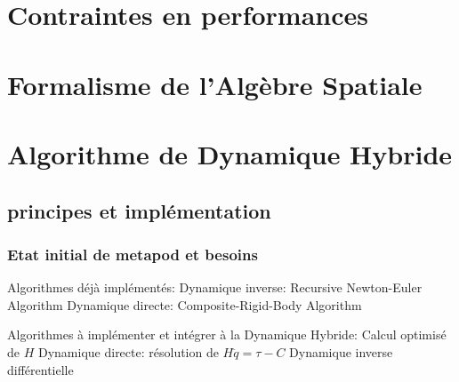 \documentclass[11pt]{beamer}
\begin{document}

\section{Contraintes en performances}


\section{Formalisme de l'Algèbre Spatiale}


\section{Algorithme de Dynamique Hybride}

\subsection{principes et implémentation}

\begin{frame}
  \frametitle{Etat initial de metapod et besoins}
 
  Algorithmes déjà implémentés:
  Dynamique inverse:	Recursive Newton-Euler Algorithm
  Dynamique directe:	Composite-Rigid-Body Algorithm
  
  Algorithmes à implémenter et intégrer à la Dynamique Hybride:
  Calcul optimisé de $H$
  Dynamique directe:	résolution de $H \ddot{q}=\tau - C$
  Dynamique inverse différentielle
  
\end{frame}
\end{document}
